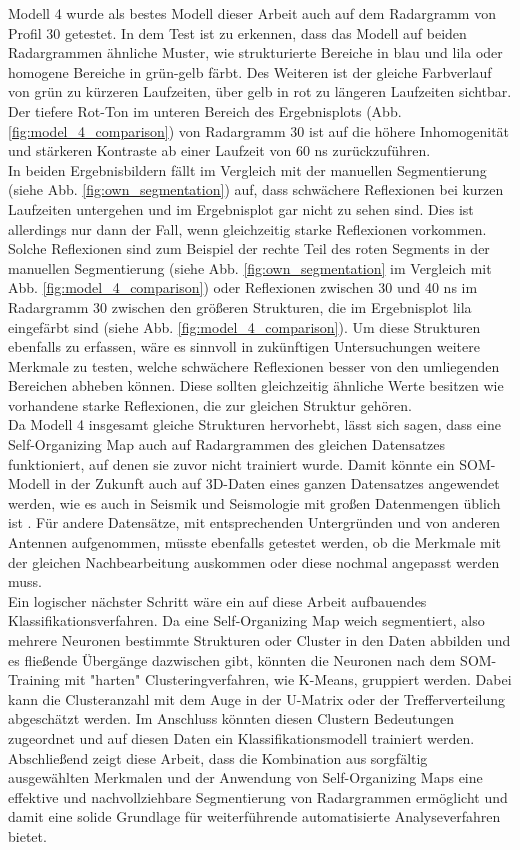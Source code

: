 Modell 4 wurde als bestes Modell dieser Arbeit auch auf dem Radargramm von Profil 30 getestet. In dem Test ist zu erkennen, dass das Modell auf beiden Radargrammen ähnliche Muster, wie strukturierte Bereiche in blau und lila oder homogene Bereiche in grün-gelb färbt. Des Weiteren ist der gleiche Farbverlauf von grün zu kürzeren Laufzeiten, über gelb in rot zu längeren Laufzeiten sichtbar. Der tiefere Rot-Ton im unteren Bereich des Ergebnisplots (Abb. \ref{fig:model_4_comparison}) von Radargramm 30 ist auf die höhere Inhomogenität und stärkeren Kontraste ab einer Laufzeit von 60 ns zurückzuführen.\\
In beiden Ergebnisbildern fällt im Vergleich mit der manuellen Segmentierung (siehe Abb. \ref{fig:own_segmentation}) auf, dass schwächere Reflexionen bei kurzen Laufzeiten untergehen und im Ergebnisplot gar nicht zu sehen sind. Dies ist allerdings nur dann der Fall, wenn gleichzeitig  starke Reflexionen vorkommen. Solche Reflexionen sind zum Beispiel der rechte Teil des roten Segments in der manuellen Segmentierung (siehe Abb. \ref{fig:own_segmentation} im Vergleich mit Abb. \ref{fig:model_4_comparison}) oder Reflexionen zwischen 30 und 40 ns im Radargramm 30 zwischen den größeren Strukturen, die im Ergebnisplot lila eingefärbt sind (siehe Abb. \ref{fig:model_4_comparison}). Um diese Strukturen ebenfalls zu erfassen, wäre es sinnvoll in zukünftigen Untersuchungen weitere Merkmale zu testen, welche schwächere Reflexionen besser von den umliegenden Bereichen abheben können. Diese sollten gleichzeitig ähnliche Werte besitzen wie vorhandene starke Reflexionen, die zur gleichen Struktur gehören.\\
Da Modell 4 insgesamt gleiche Strukturen hervorhebt, lässt sich sagen, dass eine Self-Organizing Map auch auf Radargrammen des gleichen Datensatzes funktioniert, auf denen sie zuvor nicht trainiert wurde. Damit könnte ein SOM- Modell in der Zukunft auch auf 3D-Daten eines ganzen Datensatzes angewendet werden, wie es auch in Seismik und Seismologie mit großen Datenmengen üblich ist \parencites{kohler_recognition_2009}{roden_geologic_2015}{el-dabaa_unsupervised_2024}. Für andere Datensätze, mit entsprechenden Untergründen und von anderen Antennen aufgenommen, müsste ebenfalls getestet werden, ob die Merkmale mit der gleichen Nachbearbeitung auskommen oder diese nochmal angepasst werden muss.\\
Ein logischer nächster Schritt wäre ein auf diese Arbeit aufbauendes Klassifikationsverfahren. Da eine Self-Organizing Map weich segmentiert, also mehrere Neuronen bestimmte Strukturen oder Cluster in den Daten abbilden und es fließende Übergänge dazwischen gibt, könnten die Neuronen nach dem SOM-Training mit "harten" Clusteringverfahren, wie K-Means, gruppiert werden. Dabei kann die Clusteranzahl mit dem Auge in der U-Matrix oder der Trefferverteilung abgeschätzt werden. Im Anschluss könnten diesen Clustern Bedeutungen zugeordnet und auf diesen Daten ein Klassifikationsmodell trainiert werden.\\
Abschließend zeigt diese Arbeit, dass die Kombination aus sorgfältig ausgewählten Merkmalen und der Anwendung von Self-Organizing Maps eine effektive und nachvollziehbare Segmentierung von Radargrammen ermöglicht und damit eine solide Grundlage für weiterführende automatisierte Analyseverfahren bietet.
